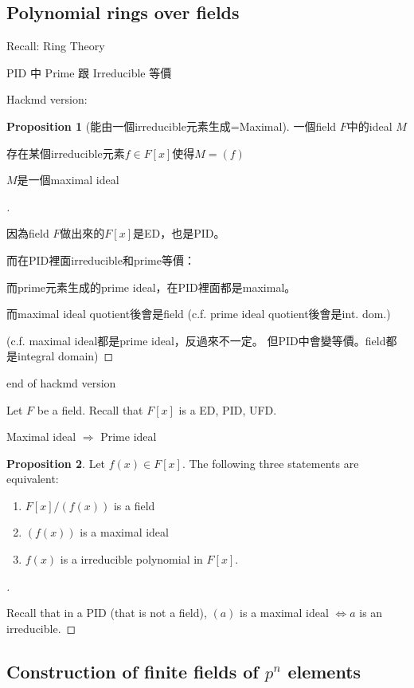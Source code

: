 \documentclass{article}
\theoremstyle{definition}
\newtheorem{prop}{Proposition}
\newenvironment{proofs}[1][\proofname]{%
  \begin{proof}[#1]$ $\par\nobreak\ignorespaces
}{%
  \end{proof}
}
\begin{document}
  \subsection{Polynomial rings over fields}

  Recall: Ring Theory
  
  PID 中 Prime 跟 Irreducible 等價


  Hackmd version:

  \begin{prop}[能由一個irreducible元素生成=Maximal]
	一個field $F$中的ideal $M$
	
	存在某個irreducible元素$f\in F[x]$使得$M=(f)$

	$M$是一個maximal ideal
  \end{prop}

  \begin{proofs}
	因為field $F$做出來的$F[x]$是ED，也是PID。
	
	而在PID裡面irreducible和prime等價：
	
	而prime元素生成的prime ideal，在PID裡面都是maximal。
	
	而maximal ideal quotient後會是field (c.f. prime ideal quotient後會是int. dom.)

	(c.f. maximal ideal都是prime ideal，反過來不一定。
	但PID中會變等價。field都是integral domain)
  \end{proofs}
  end of hackmd version

  Let $F$ be a field. Recall that $F[x]$ is a ED, PID, UFD. 

  Maximal ideal $\Rightarrow$ Prime ideal


  \begin{prop}
	Let $f(x) \in F[x]$. The following three statements are equivalent:
	\begin{enumerate}
		\item $F[x]/(f(x))$ is a field 
		\item $(f(x))$ is a maximal ideal 
		\item $f(x)$ is a irreducible polynomial in $F[x]$. 
	\end{enumerate}
  \end{prop}
  
  \begin{proofs}
	Recall that in a PID (that is not a field), $(a)$ is a maximal ideal $\Leftrightarrow a$ is an irreducible. 
  \end{proofs}
  
  \subsection*{Construction of finite fields of $p^n$ elements}
  
\end{document}

